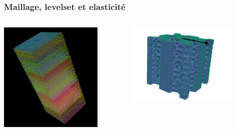 \documentclass{beamer}
\begin{document}
	
	\begin{frame}
		\frametitle{Maillage, levelset et elasticité}
		\begin{columns}
			\begin{column}{0.45\textwidth}
				\includegraphics[width=0.8\textwidth]{mesh}
			\end{column}
			\begin{column}{0.45\textwidth}
				\includegraphics[width=0.8\textwidth]{Forces}
			\end{column}
		\end{columns}
	\end{frame}
\end{document}
